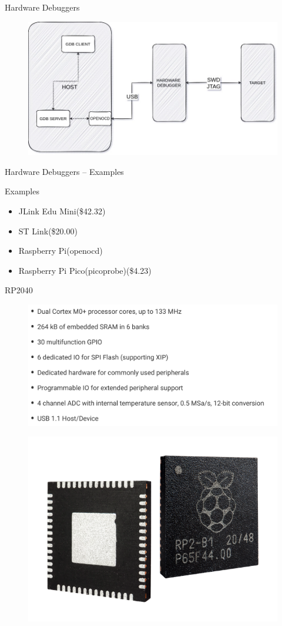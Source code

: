 \documentclass{beamer}
\begin{document}
\begin{frame}{Hardware Debuggers}
	\begin{figure}
		\includegraphics[width=.7\linewidth,height=.5\linewidth]{images/debugging.jpg}
	\end{figure}
\end{frame}
	
\begin{frame}{Hardware Debuggers -- Examples}
	\begin{block}{Examples}
		\begin{itemize}
			\item JLink Edu Mini(\$42.32)
			\item ST Link(\$20.00)
			\item Raspberry Pi(openocd) 
			\item Raspberry Pi Pico(picoprobe)(\$4.23)
		\end{itemize}
	\end{block}
\end{frame}

\begin{frame}{RP2040 }
	\begin{figure}
		\includegraphics[width=.7\linewidth,height=.4\linewidth]{images/rp2040_specs.png}
	\end{figure}
\begin{figure}
	\includegraphics[width=.4\linewidth,height=.3\linewidth]{images/rp2040.png}
\end{figure}
\end{frame}
\end{document}
